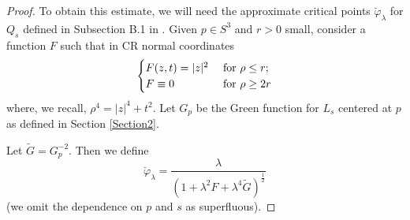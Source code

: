 \documentclass[10pt,a4paper]{amsart}
\renewcommand{\phi}{\varphi}
\renewcommand{\l}{\lambda }
\newcommand{\var}{\varphi }
\begin{document}
\begin{proof}
To obtain this estimate, we will need the approximate critical points $\breve{\phi}_{\lambda}$ for $Q_s$ defined in Subsection B.1 in \cite{CMY2}.
 Given $p\in S^3$ and $r>0$ small, consider a function $F$ such that in CR normal coordinates
$$ \begin{cases}
  F(z,t) = |z|^2 & \hbox{ for } \rho\leq r; \\
  F \equiv 0 & \hbox{ for } \rho\geq 2 r
  \end{cases}$$
  where, we recall, $\rho^4=|z|^4+t^2$.
  Let $G_p$ be the Green function for $L_s$ centered at $p$ as defined in Section \ref{Section2}.
  
  Let $\widetilde{G}=G_p^{-2}$. Then we define
  $$\breve{\var}_{\lambda} = \frac{\l}{\left( 1 + \l^2 F + \l^4 \tilde{G} \right)^{\frac 12}}$$
  (we omit the dependence on $p$ and $s$ as superfluous).


\end{proof}
\end{document}
